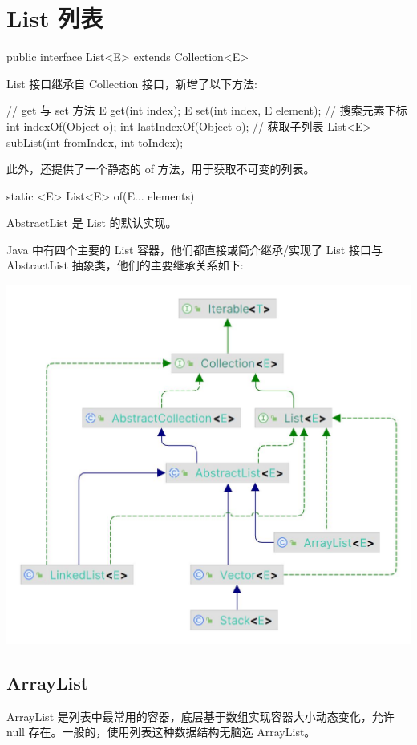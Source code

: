 \section{List 列表}

\begin{Java}
public interface List<E> extends Collection<E>
\end{Java}

List 接口继承自 Collection 接口，新增了以下方法:

\begin{Java}
// get 与 set 方法
E get(int index);
E set(int index, E element);
// 搜索元素下标
int indexOf(Object o);
int lastIndexOf(Object o);
// 获取子列表
List<E> subList(int fromIndex, int toIndex);
\end{Java}

此外，还提供了一个静态的 of 方法，用于获取不可变的列表。

\begin{Java}
static <E> List<E> of(E... elements)
\end{Java}

AbstractList 是 List 的默认实现。

Java 中有四个主要的 List 容器，他们都直接或简介继承/实现了 List 接口与 AbstractList 抽象类，他们的主要继承关系如下:

\begin{center}
    \includegraphics[width=0.6\linewidth]{../../imgs/List.jpg}
\end{center}

\subsection{ArrayList}

ArrayList 是列表中最常用的容器，底层基于数组实现容器大小动态变化，允许 null 存在。一般的，使用列表这种数据结构无脑选 ArrayList。

